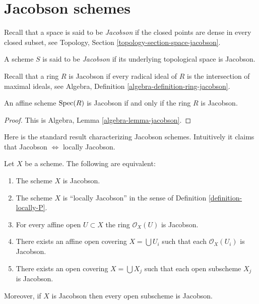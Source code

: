 \section{Jacobson schemes}
\label{section-jacobson}

\noindent
Recall that a space is said to be {\it Jacobson} if the closed points are
dense in every closed subset, see
Topology, Section \ref{topology-section-space-jacobson}.

\begin{definition}
\label{definition-jacobson}
A scheme $S$ is said to be {\it Jacobson} if its underlying topological
space is Jacobson.
\end{definition}

\noindent
Recall that a ring $R$ is Jacobson if every radical ideal of $R$
is the intersection of maximal ideals, see
Algebra, Definition \ref{algebra-definition-ring-jacobson}.

\begin{lemma}
\label{lemma-affine-jacobson}
An affine scheme $\mathop{\mathrm{Spec}}(R)$ is Jacobson if and only if
the ring $R$ is Jacobson.
\end{lemma}

\begin{proof}
This is Algebra, Lemma \ref{algebra-lemma-jacobson}.
\end{proof}

\noindent
Here is the standard result characterizing Jacobson schemes.
Intuitively it claims that Jacobson $\Leftrightarrow$ locally Jacobson.

\begin{lemma}
\label{lemma-locally-jacobson}
Let $X$ be a scheme. The following are equivalent:
\begin{enumerate}
\item The scheme $X$ is Jacobson.
\item The scheme $X$ is ``locally Jacobson'' in the sense of
Definition \ref{definition-locally-P}.
\item For every affine open $U \subset X$ the ring $\mathcal{O}_X(U)$
is Jacobson.
\item There exists an affine open covering $X = \bigcup U_i$ such that
each $\mathcal{O}_X(U_i)$ is Jacobson.
\item There exists an open covering $X = \bigcup X_j$
such that each open subscheme $X_j$ is Jacobson.
\end{enumerate}
Moreover, if $X$ is Jacobson then every open subscheme
is Jacobson.
\end{lemma}

